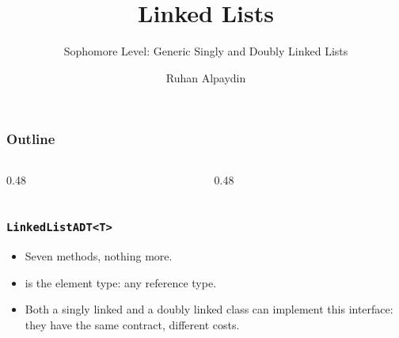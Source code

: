 \documentclass[aspectratio=169,10pt,compress]{beamer}
\title{Linked Lists}
\subtitle{Sophomore Level: Generic Singly and Doubly Linked Lists}
\author[Alpaydin]{Ruhan Alpaydin}
\institute[FCIS]{
    Faculty of Computer and Information Sciences\\
    Yeditepe University
}
\date{
	{\tiny \hbTimeStamp}
}
\begin{document}
\begin{frame}[t,fragile]
  \titlepage
\end{frame}




\begin{frame}[t,fragile] \frametitle{Outline}
  \begin{columns}[T]
    \begin{column}{0.48\textwidth}
      \tableofcontents[sections={1-3}, hideallsubsections]
    \end{column}
    \begin{column}{0.48\textwidth}
      \tableofcontents[sections={4-6}, hideallsubsections]
    \end{column}
  \end{columns}
\end{frame}





\begin{frame}[t,fragile] \frametitle{\texttt{LinkedListADT<T>}}
  \begin{itemize}\small
    \item Seven methods, nothing more.
    \item {} is the element type: any reference type.
    \item Both a singly linked and a doubly linked class can implement
          this interface: they have the same contract, different costs.
  \end{itemize}
\end{frame}
\end{document}
